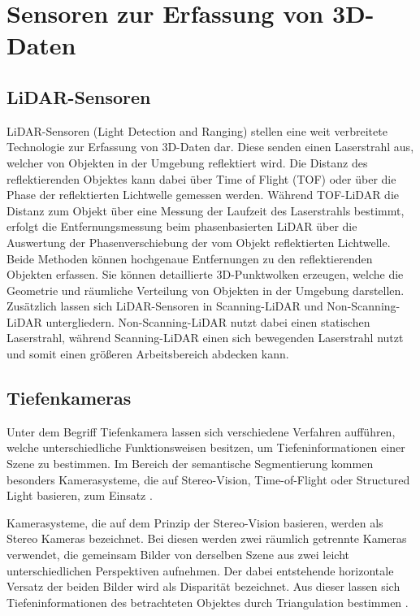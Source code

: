 \chapter{Sensoren zur Erfassung von 3D-Daten}

\section{LiDAR-Sensoren}
LiDAR-Sensoren (Light Detection and Ranging) stellen eine weit verbreitete
Technologie zur Erfassung von 3D-Daten dar. Diese senden einen Laserstrahl aus,
welcher von Objekten in der Umgebung reflektiert wird. Die Distanz des
reflektierenden Objektes kann dabei über Time of Flight (TOF) oder über die
Phase der reflektierten Lichtwelle gemessen werden. Während TOF-LiDAR die
Distanz zum Objekt über eine Messung der Laufzeit des Laserstrahls bestimmt,
erfolgt die Entfernungsmessung beim phasenbasierten LiDAR über die Auswertung
der Phasenverschiebung der vom Objekt reflektierten Lichtwelle. Beide Methoden
können hochgenaue Entfernungen zu den reflektierenden Objekten erfassen. Sie
können detaillierte 3D-Punktwolken erzeugen, welche die Geometrie und räumliche
Verteilung von Objekten in der Umgebung darstellen. Zusätzlich lassen sich
LiDAR-Sensoren in Scanning-LiDAR und Non-Scanning-LiDAR untergliedern.
Non-Scanning-LiDAR nutzt dabei einen statischen Laserstrahl, während
Scanning-LiDAR einen sich bewegenden Laserstrahl nutzt und somit einen größeren
Arbeitsbereich abdecken kann. \cite{8529992}

\section{Tiefenkameras}
Unter dem Begriff Tiefenkamera lassen sich verschiedene Verfahren aufführen,
welche unterschiedliche Funktionsweisen besitzen, um Tiefeninformationen einer
Szene zu bestimmen. Im Bereich der semantische Segmentierung kommen besonders
Kamerasysteme, die auf Stereo-Vision, Time-of-Flight oder Structured Light
basieren, zum Einsatz \cite{20222324}.

Kamerasysteme, die auf dem Prinzip der Stereo-Vision basieren, werden als
Stereo Kameras bezeichnet. Bei diesen werden zwei räumlich getrennte Kameras
verwendet, die gemeinsam Bilder von derselben Szene aus zwei leicht
unterschiedlichen Perspektiven aufnehmen. Der dabei entstehende horizontale
Versatz der beiden Bilder wird als Disparität bezeichnet. Aus dieser lassen
sich Tiefeninformationen des betrachteten Objektes durch Triangulation
bestimmen \cite{8932817}.


